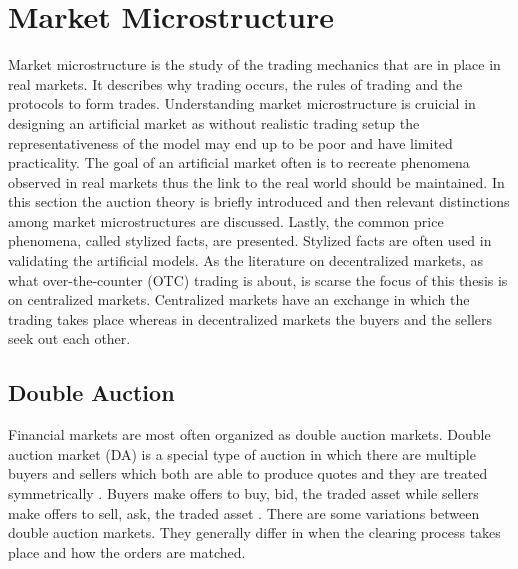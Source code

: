 \section{Market Microstructure}

Market microstructure is the study of the trading mechanics that are in place 
in real markets. It describes why trading occurs, the rules of trading 
and the protocols to form trades. \citep[p. 3-4]{Has07}
Understanding market microstructure is cruicial in designing an artificial market
as without realistic trading setup the representativeness of the model may end
up to be poor and have limited practicality. The goal of an artificial market often
is to recreate phenomena observed in real markets thus the link to the real world 
should be maintained. In this section the auction theory is briefly introduced and 
then relevant distinctions among market microstructures are discussed. 
Lastly, the common price phenomena, called stylized facts, are presented. Stylized facts
are often used in validating the artificial models. As the literature on decentralized 
markets, as what over-the-counter (OTC) trading is about, is scarse the focus of this thesis is 
on centralized markets. Centralized markets have an exchange in which the trading takes place 
whereas in decentralized markets the buyers and the sellers seek out each other.


\subsection{Double Auction}

Financial markets are most often organized as double auction markets.
Double auction market (DA) is a special type of auction in which there
are multiple buyers and sellers which both are able to 
produce quotes and they are treated symmetrically \citep*{Kle99}. Buyers
make offers to buy, bid, the traded asset while sellers make offers
to sell, ask, the traded asset \citep*{Moc15}. There are some variations 
between double auction markets. They generally differ in when the clearing process takes place 
and how the orders are matched. 


